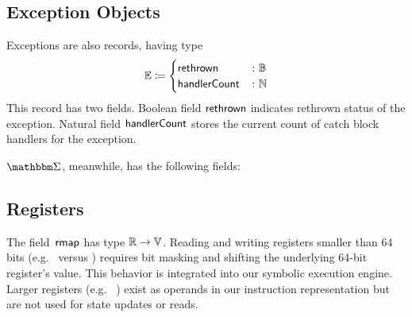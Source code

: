 \subsection{Exception Objects}
\begin{definition}
  Exceptions are also records, having type
  \begin{equation*}
    \mathbb E\coloneqq\begin{cases}
      \mathsf{rethrown} &\colon \mathbb B \\
      \mathsf{handlerCount} &\colon \mathbb N
    \end{cases}
  \end{equation*}
  This record has two fields.
  Boolean field $\mathsf{rethrown}$ indicates rethrown status of the exception.
  Natural field $\mathsf{handlerCount}$ stores the current count of catch block handlers for the exception.
\end{definition}
$\absState$, meanwhile, has the following fields:

\subsection{Registers}
The field~$\operatorname{\mathsf{rmap}}$ has type $\mathbb R\to\mathbb V$.
Reading and writing registers smaller than 64 bits (e.g.\  versus ) requires bit masking and shifting the underlying 64-bit register's value.
This behavior is integrated into our symbolic execution engine.
Larger registers (e.g.\ %
) exist as operands in our instruction representation but are not used for state updates or reads.

